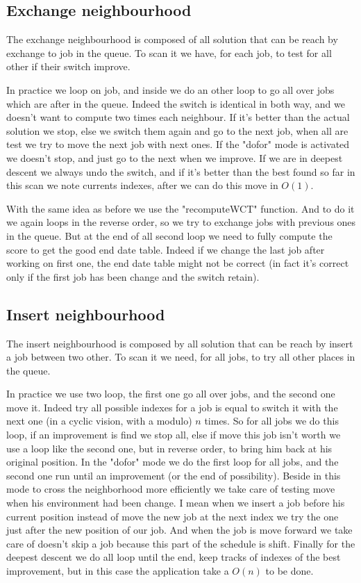 \documentclass[12pt,a4paper]{article}
\begin{document}
\subsection{Exchange neighbourhood}

The exchange neighbourhood is composed of all solution that can be reach by exchange to job in the queue. To scan it we have, for each job, to test for all other if their switch improve.

In practice we loop on job, and inside we do an other loop to go all over jobs which are after in the queue. Indeed the switch is identical in both way, and we doesn't want to compute two times each neighbour. If it's better than the actual solution we stop, else we switch them again and go to the next job, when all are test we try to move the next job with next ones. If the "dofor" mode is activated we doesn't stop, and just go to the next when we improve. If we are in deepest descent we always undo the switch, and if it's better than the best found so far in this scan we note currents indexes, after we can do this move in $O(1)$.

With the same idea as before we use the "recomputeWCT" function. And to do it we again loops in the reverse order, so we try to exchange jobs with previous ones in the queue. But at the end of all second loop we need to fully compute the score to get the good end date table. Indeed if we change the last job after working on first one, the end date table might not be correct (in fact it's correct only if the first job has been change and the switch retain).

\subsection{Insert neighbourhood}

The insert neighbourhood is composed by all solution that can be reach by insert a job between two other. To scan it we need, for all jobs, to try all other places in the queue.

In practice we use two loop, the first one go all over jobs, and the second one move it. Indeed try all possible indexes for a job is equal to switch it with the next one (in a cyclic vision, with a modulo) $n$ times. So for all jobs we do this loop, if an improvement is find we stop all, else if move this job isn't worth we use a loop like the second one, but in reverse order, to bring him back at his original position. In the "dofor" mode we do the first loop for all jobs, and the second one run until an improvement (or the end of possibility). Beside in this mode to cross the neighborhood more efficiently we take care of testing move when his environment had been change. I mean when we insert a job before his current position instead of move the new job at the next index we try the one just after the new position of our job. And when the job is move forward we take care of doesn't skip a job because this part of the schedule is shift. Finally for the deepest descent we do all loop until the end, keep tracks of indexes of the best improvement, but in this case the application take a $O(n)$ to be done.
\end{document}
